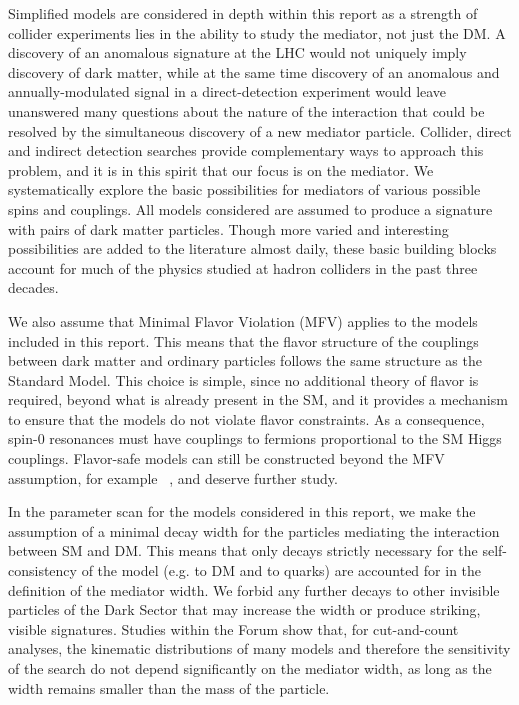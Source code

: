 Simplified models are considered in depth within this report as a strength of collider experiments lies in the ability to
study the mediator, not just the DM. A discovery of an
anomalous \MET signature
at the LHC would not uniquely imply discovery of dark matter, while at
the same time discovery of an anomalous and annually-modulated signal
in a direct-detection experiment would leave unanswered many questions
about the nature of the interaction that could be resolved by the simultaneous discovery
of a new mediator particle. 
Collider, direct and indirect detection searches provide complementary ways to
approach this problem, and it is in this spirit that our focus is on
the mediator. We systematically explore the basic possibilities for
mediators of various possible spins and couplings.
All models considered are assumed to produce a signature with pairs of dark matter particles.
Though more varied and
interesting possibilities are added to the literature almost daily,
these basic building blocks account for much of the physics studied at
hadron colliders in the past three decades.

We also assume that Minimal Flavor Violation (MFV) \cite{Chivukula:1987py,Hall:1990ac,Buras:2000dm,D'Ambrosio:2002ex} applies to the
models included in this report. This means that the flavor structure of the
couplings between dark matter and ordinary particles follows the same
structure as the Standard Model. This choice is simple, since no
additional theory of flavor is required, beyond what is already
present in the SM, and it provides a mechanism to ensure that the
models do not violate flavor constraints.  As a consequence, spin-0
resonances must have couplings to fermions proportional to the SM Higgs couplings. 
Flavor-safe models can still be constructed beyond the MFV
assumption, for example ~\cite{Agrawal:2014aoa}, and deserve further study.

In the parameter scan for the models considered in this report, we make the
assumption of a minimal decay width for the particles mediating the
interaction between SM and DM.  This means that only decays
strictly necessary for the self-consistency of the model (e.g.  to DM
and to quarks) are accounted for in the definition of the mediator
width. We forbid any further decays to other invisible particles of
the Dark Sector that may increase the width or produce striking, visible signatures. 
Studies within the Forum
show that, for cut-and-count analyses, the kinematic distributions of
many models and therefore the sensitivity of the search do not depend
significantly on the mediator width, as long as the width remains smaller
than the mass of the particle.

